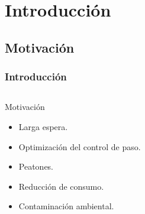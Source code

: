 \section{Introducción} 
\newcommand{\tamInterseccion}{0.8}

\subsection{Motivación}

\begin{frame}
	\frametitle{Introducción}
		\begin{columns}[T]
            \begin{column}{.60\textwidth}
                      \begin{block}{Motivación}
                        \begin{itemize}
                                 \item Larga espera.
                                 \item Optimización del control de paso.
                                 \item Peatones.
                                 \item Reducción de consumo.
                                 \item Contaminación ambiental.
                         \end{itemize}
                \end{block}
              \end{column}
              \hfill
            \begin{column}{.40\textwidth}


\end{column}
\end{columns}
\end{frame}
